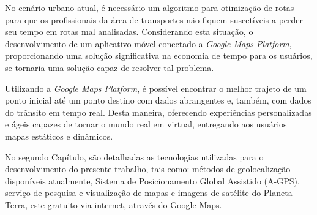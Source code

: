 
No cenário urbano atual, é necessário um algoritmo para otimização de rotas para que os profissionais da área de transportes não fiquem suscetíveis a perder seu tempo em rotas mal analisadas. Considerando esta situação, o desenvolvimento de um aplicativo móvel conectado a \textit{Google Maps Platform}, proporcionando uma solução significativa na economia de tempo para os usuários, se tornaria uma solução capaz de resolver tal problema.


Utilizando a \textit{Google Maps Platform}, é possível encontrar o melhor trajeto de um ponto inicial até um ponto destino com dados abrangentes e, também, com dados do trânsito em tempo real. Desta maneira, oferecendo experiências personalizadas e ágeis capazes de tornar o mundo real em virtual, entregando aos usuários mapas estáticos e dinâmicos. 


No segundo Capítulo, são detalhadas as tecnologias utilizadas para o desenvolvimento do presente trabalho, tais como: métodos de geolocalização disponíveis atualmente, Sistema de Posicionamento Global Assistido (A-GPS), serviço de pesquisa e visualização de mapas e imagens de satélite do Planeta Terra, este gratuito via internet, através do Google Maps.

